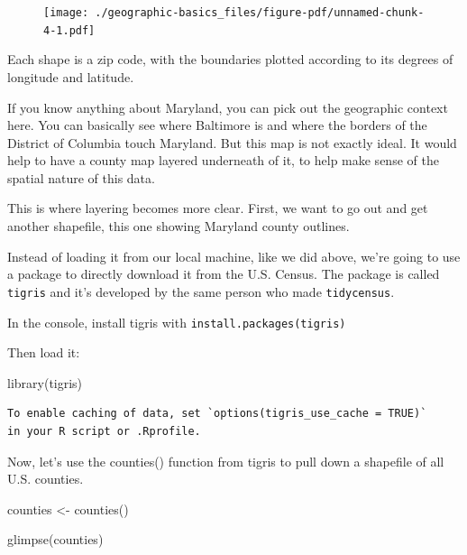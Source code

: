 \documentclass[
  letterpaper,
  DIV=11,
  numbers=noendperiod]{scrreprt}
\newenvironment{Shaded}{\begin{snugshade}}{\end{snugshade}}
\newcommand{\FunctionTok}[1]{\textcolor[rgb]{0.28,0.35,0.67}{#1}}
\newcommand{\NormalTok}[1]{\textcolor[rgb]{0.00,0.23,0.31}{#1}}
\newcommand{\OtherTok}[1]{\textcolor[rgb]{0.00,0.23,0.31}{#1}}
\begin{document}
\begin{figure}[H]

{\centering \texttt{[image: ./geographic-basics\_files/figure-pdf/unnamed-chunk-4-1.pdf]}

}

\end{figure}

Each shape is a zip code, with the boundaries plotted according to its
degrees of longitude and latitude.

If you know anything about Maryland, you can pick out the geographic
context here. You can basically see where Baltimore is and where the
borders of the District of Columbia touch Maryland. But this map is not
exactly ideal. It would help to have a county map layered underneath of
it, to help make sense of the spatial nature of this data.

This is where layering becomes more clear. First, we want to go out and
get another shapefile, this one showing Maryland county outlines.

Instead of loading it from our local machine, like we did above, we're
going to use a package to directly download it from the U.S. Census. The
package is called \texttt{tigris} and it's developed by the same person
who made \texttt{tidycensus}.

In the console, install tigris with
\texttt{install.packages(\textquotesingle{}tigris\textquotesingle{})}

Then load it:

\begin{Shaded}
\begin{Highlighting}[]
\FunctionTok{library}\NormalTok{(tigris)}
\end{Highlighting}
\end{Shaded}

\begin{verbatim}
To enable caching of data, set `options(tigris_use_cache = TRUE)`
in your R script or .Rprofile.
\end{verbatim}

Now, let's use the counties() function from tigris to pull down a
shapefile of all U.S. counties.

\begin{Shaded}
\begin{Highlighting}[]
\NormalTok{counties }\OtherTok{\textless{}{-}} \FunctionTok{counties}\NormalTok{()}

\FunctionTok{glimpse}\NormalTok{(counties)}
\end{Highlighting}
\end{Shaded}
\end{document}
